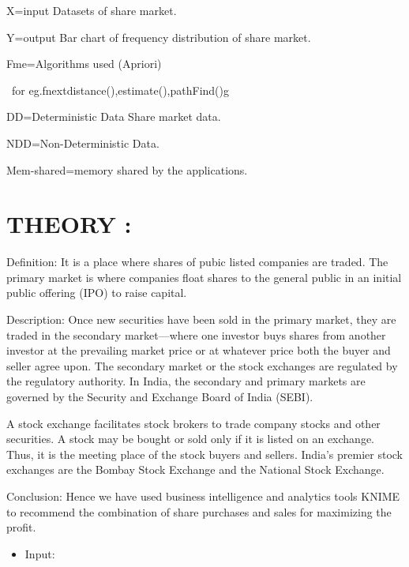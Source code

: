 \documentclass[a4paper,12pt]{article}
\begin{document}
{\rmfamily
	X=input
	Datasets of share market.
	
	{\rmfamily
		Y=output
		Bar chart of frequency distribution of share market.}
	
	{\rmfamily
		Fme=Algorithms used (Apriori)}
	
	\textrm{\ for eg.fnextdistance(),estimate(),pathFind()g}
	
	{\rmfamily
		DD=Deterministic Data
		Share market data.
	}
	
	{\rmfamily
		NDD=Non-Deterministic Data.}
	
	{\rmfamily
		Mem-shared=memory shared by the applications.}
	
	
	\bigskip

\section{THEORY : }

Definition: It is a place where shares of pubic listed companies are traded. The primary market is where companies float shares to the general public in an initial public offering (IPO) to raise capital.

Description: Once new securities have been sold in the primary market, they are traded in the secondary market—where one investor buys shares from another investor at the prevailing market price or at whatever price both the buyer and seller agree upon. The secondary market or the stock exchanges are regulated by the regulatory authority. In India, the secondary and primary markets are governed by the Security and Exchange Board of India (SEBI).

A stock exchange facilitates stock brokers to trade company stocks and other securities. A stock may be bought or sold only if it is listed on an exchange. Thus, it is the meeting place of the stock buyers and sellers. India's premier stock exchanges are the Bombay Stock Exchange and the National Stock Exchange.

Conclusion:
Hence we have used business intelligence and analytics tools  KNIME to recommend the combination of share purchases and sales for maximizing the profit.

\begin{itemize} 	
\newpage
\item Input:


\end{itemize}}
\end{document}
